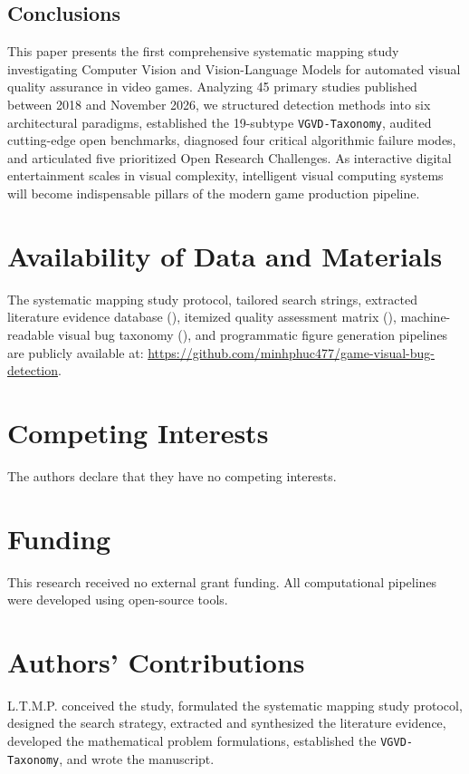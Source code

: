 \documentclass[preprint,12pt,3p]{elsarticle}
\begin{document}
\subsection{Conclusions}
This paper presents the first comprehensive systematic mapping study investigating Computer Vision and Vision-Language Models for automated visual quality assurance in video games. Analyzing 45 primary studies published between 2018 and November 2026, we structured detection methods into six architectural paradigms, established the 19-subtype \texttt{VGVD-Taxonomy}, audited cutting-edge open benchmarks, diagnosed four critical algorithmic failure modes, and articulated five prioritized Open Research Challenges. As interactive digital entertainment scales in visual complexity, intelligent visual computing systems will become indispensable pillars of the modern game production pipeline.

\section*{Availability of Data and Materials}
The systematic mapping study protocol, tailored search strings, extracted literature evidence database (), itemized quality assessment matrix (), machine-readable visual bug taxonomy (), and programmatic figure generation pipelines are publicly available at: \url{https://github.com/minhphuc477/game-visual-bug-detection}.

\section*{Competing Interests}
The authors declare that they have no competing interests.

\section*{Funding}
This research received no external grant funding. All computational pipelines were developed using open-source tools.

\section*{Authors' Contributions}
L.T.M.P. conceived the study, formulated the systematic mapping study protocol, designed the search strategy, extracted and synthesized the literature evidence, developed the mathematical problem formulations, established the \texttt{VGVD-Taxonomy}, and wrote the manuscript.



\end{document}
